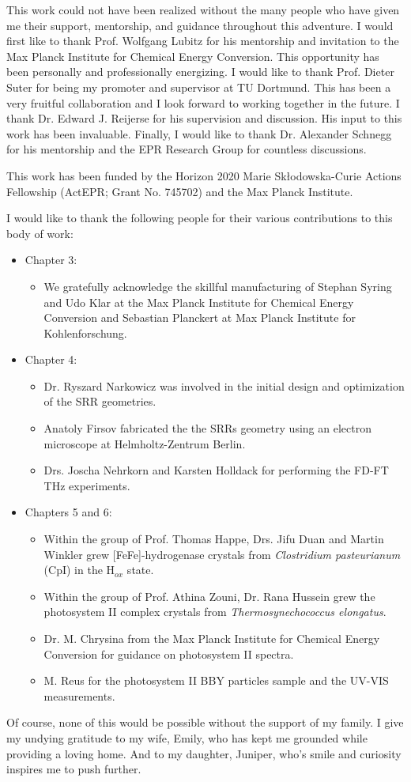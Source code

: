 
This work could not have been realized without the many people who have given me their support, mentorship, and guidance throughout this adventure. I would first like to thank Prof. Wolfgang Lubitz for his mentorship and invitation to the Max Planck Institute for Chemical Energy Conversion. This opportunity has been personally and professionally energizing. I would like to thank Prof. Dieter Suter for being my promoter and supervisor at TU Dortmund. This has been a very fruitful collaboration and I look forward to working together in the future. I thank Dr. Edward J. Reijerse for his supervision and discussion. His input to this work has been invaluable. Finally, I would like to thank Dr. Alexander Schnegg for his mentorship and the EPR Research Group for countless discussions. 

This work has been funded by the Horizon 2020 Marie Sk\l{}odowska-Curie Actions Fellowship (ActEPR; Grant No. 745702) and the Max Planck Institute. 

I would like to thank the following people for their various contributions to this body of work:
\begin{itemize}
    \item Chapter 3: 
    \begin{itemize}
        \item We gratefully acknowledge the skillful manufacturing of Stephan Syring and Udo Klar at the Max Planck Institute for Chemical Energy Conversion and Sebastian Planckert at Max Planck Institute for Kohlenforschung.
    \end{itemize}
    \item Chapter 4:
    \begin{itemize}
        \item Dr. Ryszard Narkowicz was involved in the initial design and optimization of the SRR geometries. 
        \item Anatoly Firsov fabricated the the SRRs geometry using an electron microscope at Helmholtz-Zentrum Berlin. 
        \item Drs. Joscha Nehrkorn and Karsten Holldack for performing the FD-FT THz experiments.
    \end{itemize}
    \item Chapters 5 and 6:
    \begin{itemize}
        \item Within the group of Prof. Thomas Happe, Drs. Jifu Duan and Martin Winkler grew [FeFe]-hydrogenase crystals from {\em Clostridium pasteurianum} (CpI) in the H$_{ox}$ state.
        \item Within the group of Prof. Athina Zouni, Dr. Rana Hussein grew the photosystem II complex crystals from {\em Thermosynechococcus elongatus}. 
        \item Dr. M. Chrysina from the Max Planck Institute for Chemical Energy Conversion for guidance on photosystem II spectra.
        \item M. Reus for the photosystem II BBY particles sample and the UV-VIS measurements.     
    \end{itemize}
\end{itemize}

Of course, none of this would be possible without the support of my family. I give my undying gratitude to my wife, Emily, who has kept me grounded while providing a loving home. And to my daughter, Juniper, who's smile and curiosity inspires me to push further.
 